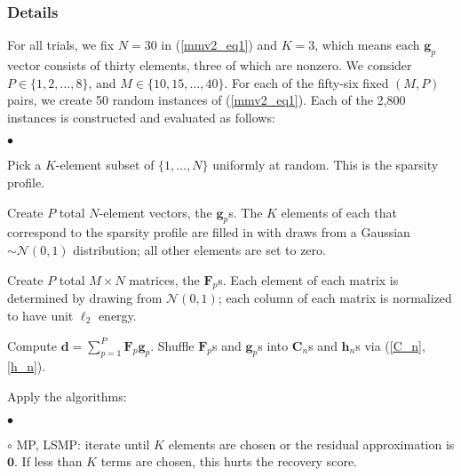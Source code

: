 \documentclass[final]{siamltex}
\newenvironment{adamItemize2}{\begin{list}{$\bullet$}
{\setlength{\rightmargin}{0em}
\setlength{\leftmargin}{1.0em}
\setlength{\itemsep}{4pt}
\setlength{\topsep}{2pt}
\setlength{\parsep}{0pt}}}{\end{list}}
\newcommand{\la}[1]{\mbox{$\mathbf{#1}$}}  \newcommand{\sst}[1]{\mbox{\scriptsize{#1}}}
\begin{document}
   \subsubsection{Details}\label{subsubsec:e1} For all trials, we fix
   $N=30$ in (\ref{mmv2_eq1}) and $K=3$, which means each $\la{g}_p$
   vector consists of thirty elements, three of which are nonzero.  We
   consider $P \in \{1, 2, \ldots, 8\}$, and $M \in \{10, 15, \ldots,
   40\}$.  For each of the fifty-six fixed $(M, P)$ pairs, we create
   50 random instances of (\ref{mmv2_eq1}).  Each of the 2,800
   instances is constructed and evaluated as follows:
   \begin{adamItemize2}

   \item Pick a $K$-element subset of $\{ 1, \ldots, N \}$ uniformly
   at random.  This is the sparsity profile.

   \item Create $P$ total $N$-element vectors, the $\la{g}_p$s.  The
   $K$ elements of each that correspond to the sparsity profile are
   filled in with draws from a Gaussian $\sim \mathcal{N}(0, 1)$
   distribution; all other elements are set to zero.

   \item Create $P$ total $M \times N$ matrices, the $\la{F}_p$s.
   Each element of each matrix is determined by drawing from
   $\mathcal{N}(0, 1)$; each column of each matrix is normalized to
   have unit $\ell_2$ energy.

   \item Compute $\la{d} = \sum_{p=1}^{P} \la{F}_p \la{g}_p$. Shuffle
   $\la{F}_p$s and $\la{g}_p$s into $\la{C}_n$s and $\la{h}_n$s via
   (\ref{C_n}, \ref{h_n}).

   \item Apply the algorithms:

       \begin{adamItemize2}

       \item[$\circ$] MP, LSMP: iterate until $K$ elements are chosen
       or the residual approximation is $\la{0}$.  If less than $K$
       terms are chosen, this hurts the recovery score.


\end{adamItemize2}
\end{adamItemize2}
\end{document}
